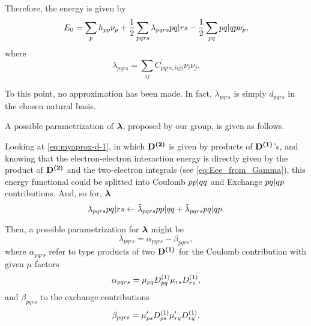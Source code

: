 Therefore, the energy is given by
\begin{equation} \label{eq:myaprox-E0-1}
    E_0 =
    \sum_{p} h_{pp} \nu_p +
    \frac{1}{2} \sum_{pqrs} \lambda_{pqrs} \PBraket{pq | rs}
    - 
    \frac{1}{2} \sum_{pq} \PBraket{pq | qp} \nu_p
    ,
\end{equation}
where 
\begin{equation}
    \lambda_{pqrs} = \sum_{ij} 
    C_{pqrs,iijj}^{\prime} \nu_i \nu_j
    .
\end{equation}

To this point, no approximation has been made. 
In fact, $\lambda_{pqrs}$ is simply $d_{pqrs}$ in the chosen natural basis.

A possible parametrization of $\boldsymbol{\mathrm{\lambda}}$, proposed by our group, is given as follows.

Looking at \cref{eq:myaprox-d-1}, in
which $ \boldsymbol{\mathrm{D^{\left( 2 \right)}}}$ is given by products
of $ \boldsymbol{\mathrm{D^{\left( 1 \right)}}}$'s, and knowing that the electron-electron interaction energy is
directly given by the product of $ \boldsymbol{\mathrm{D^{\left( 2 \right)}}}$ and the two-electron integrals
(see \cref{eq:Eee_from_Gamma}),
this energy functional could be splitted into Coulomb $ \PBraket{pp | qq}$ and
Exchange $ \PBraket{pq | qp}$ contributions.
And, so for, $\boldsymbol{\mathrm{\lambda}}$ 
\begin{equation}
    \lambda_{pqrs} \PBraket{pq | rs}
    \leftarrow
    \tilde{\lambda}_{pqrs} \PBraket{pp | qq}
    +
    \tilde{\lambda}_{pqrs} \PBraket{pq | qp}
    .
\end{equation}

Then, a possible parametrization for $\boldsymbol{\mathrm{\lambda}}$ might be 
\begin{equation}
    \lambda_{pqrs} =
    \alpha_{pqrs}
    -
    \beta_{pqrs}
    ,
\end{equation}
where $\alpha_{pqrs}$ refer to type products of two $ \boldsymbol{\mathrm{D^{\left( 1 \right)}}}$ for the
Coulomb contribution with given $\mu$ factors
\begin{equation}
    \alpha_{pqrs} = \mu_{pq} D^{\left( 1 \right)}_{pq} \mu_{rs} D^{\left( 1 \right)}_{rs} ,
\end{equation} 
and $\beta_{pqrs}$ to the exchange contributions
\begin{equation}
    \beta_{pqrs} = \mu_{ps}^{\prime} D^{\left( 1 \right)}_{ps} \mu_{rq}^{\prime} D^{\left( 1 \right)}_{rq}.
\end{equation} 

